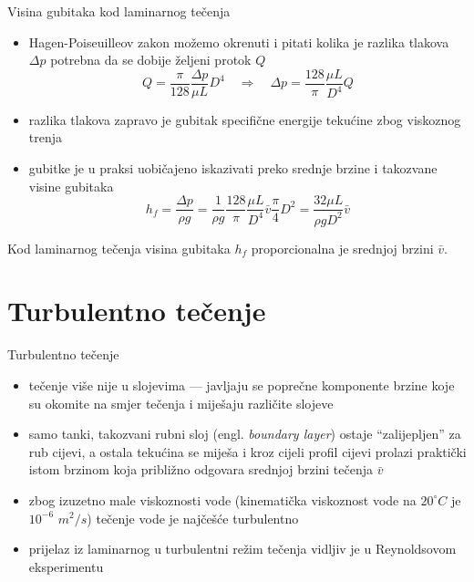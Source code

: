 \documentclass{beamer}
\begin{document}
\begin{frame}{Visina gubitaka kod laminarnog tečenja}

\begin{itemize}
\item Hagen-Poiseuilleov zakon možemo okrenuti i pitati kolika je razlika
tlakova $\Delta p$ potrebna da se dobije željeni protok $Q$
\[
Q=\frac{\pi}{128}\frac{\Delta p}{\mu L}D^{4}\quad\Rightarrow\quad\Delta p=\frac{128}{\pi}\frac{\mu L}{D^{4}}Q
\]
\item razlika tlakova zapravo je gubitak specifične energije tekućine zbog
viskoznog trenja
\item gubitke je u praksi uobičajeno iskazivati preko srednje brzine i takozvane\emph{
}\alert{visine gubitaka}
\[
h_{f}=\frac{\Delta p}{\rho g}=\frac{1}{\rho g}\frac{128}{\pi}\frac{\mu L}{D^{4}}\bar{v}\frac{\pi}{4}D^{2}=\frac{32\mu L}{\rho gD^{2}}\bar{v}
\]
\end{itemize}
\begin{alertblock}{}

Kod laminarnog tečenja visina gubitaka $h_{f}$ proporcionalna je
srednjoj brzini $\bar{v}$.
\end{alertblock}
\end{frame}

\section{Turbulentno tečenje}
\begin{frame}{Turbulentno tečenje}

\begin{itemize}
\item tečenje više nije u slojevima --- javljaju se poprečne komponente
brzine koje su okomite na smjer tečenja i miješaju različite slojeve
\item samo tanki, takozvani \alert{rubni sloj} (engl. \emph{boundary layer})
ostaje ``zalijepljen'' za rub cijevi, a ostala tekućina se miješa
i kroz cijeli profil cijevi prolazi praktički istom brzinom koja približno
odgovara srednjoj brzini tečenja $\bar{v}$
\item zbog izuzetno male viskoznosti vode (kinematička viskoznost vode na
$20^\circ C$ je $10^{-6}$ $m^{2}/s$) tečenje vode je najčešće turbulentno
\item prijelaz iz laminarnog u turbulentni režim tečenja vidljiv je u \alert{Reynoldsovom eksperimentu}
\end{itemize}
\end{frame}
\end{document}
